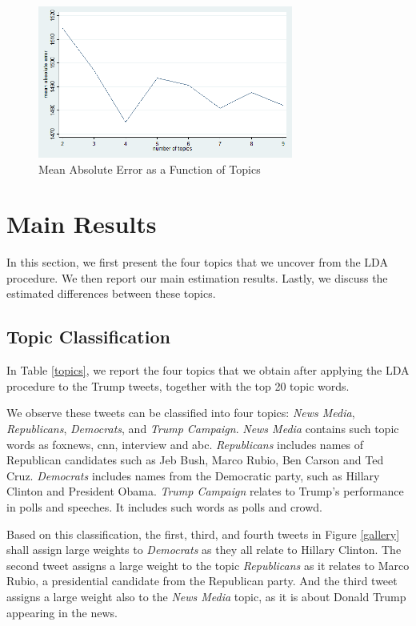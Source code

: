 \documentclass[letterpaper]{article}
\begin{document}
\begin{figure}[H]
\caption{Mean Absolute Error as a Function of Topics}
\label{mae}
\includegraphics[height=5cm]{mae_revised.png}
\end{figure}

\section{Main Results}
In this section, we first present the four topics that we uncover from the LDA procedure. We then report our main estimation results. Lastly, we discuss the estimated differences between these topics.

\subsection{Topic Classification}
In Table \ref{topics}, we report the four topics that we obtain after applying the LDA procedure to the Trump tweets, together with the top 20 topic words. 

We observe these tweets can be classified into four topics: \textit{News Media}, \textit{Republicans}, \textit{Democrats}, and \textit{Trump Campaign}. \textit{News Media} contains such topic words as foxnews, cnn, interview and abc. \textit{Republicans} includes names of Republican candidates such as Jeb Bush, Marco Rubio, Ben Carson and Ted Cruz. \textit{Democrats} includes names from the Democratic party, such as Hillary Clinton and President Obama. \textit{Trump Campaign} relates to Trump's performance in polls and speeches. It includes such words as polls and crowd.

Based on this classification, the first, third, and fourth tweets in Figure \ref{gallery} shall assign large weights to \textit{Democrats} as they all relate to Hillary Clinton. The second tweet assigns a large weight to the topic \textit{Republicans} as it relates to Marco Rubio, a presidential candidate from the Republican party. And the third tweet assigns a large weight  also to the \textit{News Media} topic, as it is about Donald Trump appearing in the news. 
\end{document}
